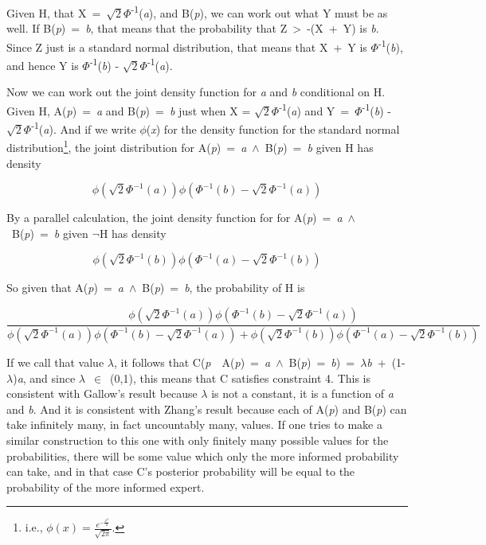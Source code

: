 \documentclass[
  12pt,
  letterpaper,
  DIV=11,
  numbers=noendperiod]{scrartcl}
\begin{document}
Given H, that X~=~\(\sqrt{2}\Phi\)\textsuperscript{-1}(\emph{a}), and
B(\emph{p}), we can work out what Y must be as well. If
B(\emph{p})~=~\emph{b}, that means that the probability that
Z~\textgreater~-(X~+~Y) is \emph{b}. Since Z just is a standard normal
distribution, that means that X~+~Y is
\(\Phi\)\textsuperscript{-1}(\emph{b}), and hence Y is
\(\Phi\)\textsuperscript{-1}(\emph{b}) -
\(\sqrt{2}\Phi\)\textsuperscript{-1}(\emph{a}).

Now we can work out the joint density function for \emph{a} and \emph{b}
conditional on H. Given H, A(\emph{p})~=~\emph{a} and
B(\emph{p})~=~\emph{b} just when X =
\(\sqrt{2}\Phi\)\textsuperscript{-1}(\emph{a}) and
Y~=~\(\Phi\)\textsuperscript{-1}(\emph{b}) -
\(\sqrt{2}\Phi\)\textsuperscript{-1}(\emph{a}). And if we write
\(\phi\)(\emph{x}) for the density function for the standard normal
distribution\footnote{i.e.,
  \(\phi(x) = \frac{e^{-\frac{x^2}{2}}}{\sqrt{2\pi}}\).}, the joint
distribution for A(\emph{p})~=~\emph{a}~$\wedge$~B(\emph{p})~=~\emph{b} given H
has density

\[
\phi(\sqrt{2}\Phi^{-1}(a)) \phi(\Phi^{-1}(b) - \sqrt{2}\Phi^{-1}(a))
\]

\noindent By a parallel calculation, the joint density function for for
A(\emph{p})~=~\emph{a}~$\wedge$~B(\emph{p})~=~\emph{b} given $\neg$H has density

\[
\phi(\sqrt{2}\Phi^{-1}(b)) \phi(\Phi^{-1}(a) - \sqrt{2}\Phi^{-1}(b))
\]

\noindent  So given that
A(\emph{p})~=~\emph{a}~$\wedge$~B(\emph{p})~=~\emph{b}, the probability of H is

\[
\frac{
\phi(\sqrt{2}\Phi^{-1}(a)) \phi(\Phi^{-1}(b) - \sqrt{2}\Phi^{-1}(a))
}{
\phi(\sqrt{2}\Phi^{-1}(a)) \phi(\Phi^{-1}(b) - \sqrt{2}\Phi^{-1}(a)) + \phi(\sqrt{2}\Phi^{-1}(b)) \phi(\Phi^{-1}(a) - \sqrt{2}\Phi^{-1}(b))
}
\]

\noindent If we call that value $\lambda$, it follows that
C(\emph{p}~\textbar~A(\emph{p})~=~\emph{a}~$\wedge$~B(\emph{p})~=~\emph{b})~=~$\lambda$\emph{b}~+~(1-$\lambda$)\emph{a},
and since $\lambda$~$\in$~(0,1), this means that C satisfies constraint 4. This is
consistent with Gallow's result because $\lambda$ is not a constant, it is a
function of \emph{a} and \emph{b}. And it is consistent with Zhang's
result because each of A(\emph{p}) and B(\emph{p}) can take infinitely
many, in fact uncountably many, values. If one tries to make a similar
construction to this one with only finitely many possible values for the
probabilities, there will be some value which only the more informed
probability can take, and in that case C's posterior probability will be
equal to the probability of the more informed expert.
\end{document}
